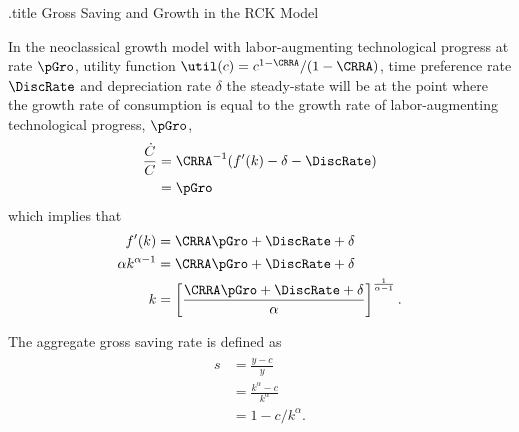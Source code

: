 \documentclass{handout}
\begin{document}
\begin{verbatimwrite}{\jobname.title}
Gross Saving and Growth in the RCK Model
\end{verbatimwrite}

\handoutHeader
\handoutNameMake

In the neoclassical growth model with labor-augmenting technological
progress at rate $\pGro$, utility function $\util(c) = c^{1-\CRRA}/(1-\CRRA)$,
time preference rate $\DiscRate$ and depreciation rate $\delta$ the
steady-state will be at the point where the growth rate of consumption
is equal to the growth rate of labor-augmenting technological 
progress, $\pGro$,
\begin{equation}\begin{gathered}\begin{aligned}
        \frac{\dot{C}}{C} & =  \CRRA^{-1}(f^{\prime}(k)-\delta-\DiscRate)  \\
         & =  \pGro  
\end{aligned}\end{gathered}\end{equation}
which implies that
\begin{equation}\begin{gathered}\begin{aligned}
        f^{\prime}(k) & =  \CRRA \pGro + \DiscRate + \delta  \\
        \alpha k^{\alpha-1} & =  \CRRA \pGro + \DiscRate + \delta  \\
    k & =  \left[\frac{\CRRA \pGro + \DiscRate + \delta}{\alpha}\right]^{\frac{1}{\alpha-1}}. 
\end{aligned}\end{gathered}\end{equation}

The aggregate gross saving rate is defined as
\begin{equation}\begin{gathered}\begin{aligned}
     s & =     \frac{y-c}{y} \\
         & =  \frac{k^{\alpha}-c}{k^{\alpha}} \\
         & =  1-c/k^{\alpha}. \label{eq:grossavrate}
\end{aligned}\end{gathered}\end{equation}
\end{document}
